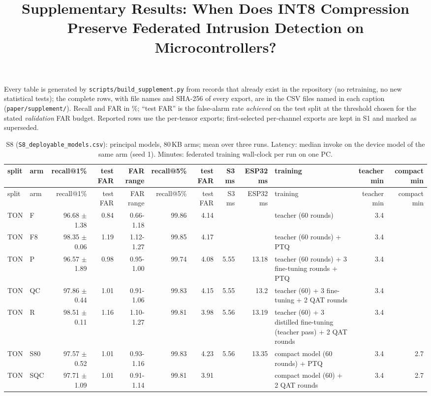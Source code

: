 \documentclass[10pt]{article}
\title{Supplementary Results: When Does INT8 Compression Preserve Federated Intrusion Detection on Microcontrollers?}
\date{}
\begin{document}
\maketitle
\noindent Every table is generated by \texttt{scripts/build\_supplement.py} from records that already exist in the
repository (no retraining, no new statistical tests); the complete rows, with file names and SHA-256 of every
export, are in the CSV files named in each caption (\texttt{paper/supplement/}). Recall and FAR in \%; ``test FAR''
is the false-alarm rate \emph{achieved} on the test split at the threshold chosen for the stated
\emph{validation} FAR budget. Reported rows use the per-tensor exports; first-selected per-channel exports are
kept in S1 and marked as superseded.

{\scriptsize
\begin{longtable}{llrrrrrrrlrr}
\caption{S8 (\texttt{S8\_deployable\_models.csv}): principal models, 80\,KB arms; mean over three runs. Latency: median invoke on the device model of the same arm (seed 1). Minutes: federated training wall-clock per run on one PC.}\\
\toprule
split & arm & recall@1\% & test FAR & FAR range & recall@5\% & test FAR & S3 ms & ESP32 ms & training & teacher min & compact min \\
\midrule
\endfirsthead
\toprule
split & arm & recall@1\% & test FAR & FAR range & recall@5\% & test FAR & S3 ms & ESP32 ms & training & teacher min & compact min \\
\midrule
\endhead
\bottomrule
\endlastfoot
TON & F & 96.68 $\pm$ 1.38 & 0.84 & 0.66-1.18 & 99.86 & 4.14 &  &  & teacher (60 rounds) & 3.4 &  \\
TON & F8 & 98.35 $\pm$ 0.06 & 1.19 & 1.12-1.27 & 99.85 & 4.17 &  &  & teacher (60 rounds) + PTQ & 3.4 &  \\
TON & P & 96.57 $\pm$ 1.89 & 0.98 & 0.95-1.00 & 99.74 & 4.08 & 5.55 & 13.18 & teacher (60 rounds) + 3 fine-tuning rounds + PTQ & 3.4 &  \\
TON & QC & 97.86 $\pm$ 0.44 & 1.01 & 0.91-1.06 & 99.83 & 4.15 & 5.55 & 13.2 & teacher (60) + 3 fine-tuning + 2 QAT rounds & 3.4 &  \\
TON & R & 98.51 $\pm$ 0.11 & 1.16 & 1.10-1.27 & 99.81 & 3.98 & 5.56 & 13.19 & teacher (60) + 3 distilled fine-tuning (teacher pass) + 2 QAT rounds & 3.4 &  \\
TON & S80 & 97.57 $\pm$ 0.52 & 1.01 & 0.93-1.16 & 99.83 & 4.23 & 5.56 & 13.35 & compact model (60 rounds) + PTQ & 3.4 & 2.7 \\
TON & SQC & 97.71 $\pm$ 1.09 & 1.01 & 0.91-1.14 & 99.81 & 3.91 &  &  & compact model (60) + 2 QAT rounds & 3.4 & 2.7 \\

\end{longtable}}
\end{document}
